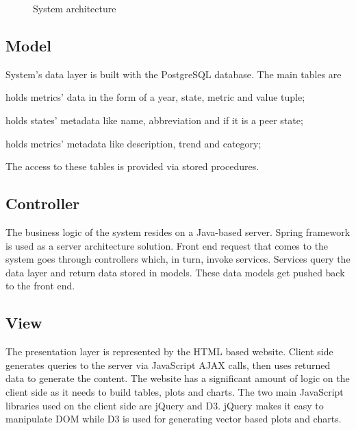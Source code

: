 		\begin{figure}[t]
			\centering
			
			\caption{System architecture}
			\label{fig:sysarch}
		\end{figure}
		
		
		\subsection{Model}
			
			System's data layer is built with the PostgreSQL database. The main tables are
			
			\begin{description}[itemsep=-1.5mm, align=right,labelwidth=3cm]
				\item [Statistics]
					holds metrics' data in the form of a year, state, metric and value tuple;
				\item [States]
					holds states' metadata like name, abbreviation and if it is a peer state;
				\item [Metrics]
					holds metrics' metadata like description, trend and category;							
			\end{description}
			
			The access to these tables is provided via stored procedures.
			
		\subsection{Controller}
		
			The business logic of the system resides on a Java-based server. Spring framework is 
			used as a server architecture solution. Front end request that comes to the system goes 
			through controllers which, in turn, invoke services. Services query the data layer and return 
			data stored	in models. These data models get pushed back to the front end.
			
		\subsection{View}
			
			The presentation layer is represented by the HTML based website. Client side generates 
			queries to the server via JavaScript AJAX calls, then uses returned data to generate the content.
			The website has a significant amount of logic on the client side as it needs to build 
			tables, plots and charts. The two main JavaScript libraries used on the client side are jQuery and D3.
			jQuery makes it easy to manipulate DOM while D3 is used for generating vector based plots and charts.
			
